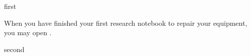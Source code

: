 \documentclass[notebook]{guildcamp4} %
\begin{document}
\startnotebook{\nJamesVerBlood{}}

\begin{page}{first}

When you have finished your first research notebook to repair your equipment, you may open .

\end{page}

\begin{page}{second}
\end{page}

\endnotebook
\end{document}
